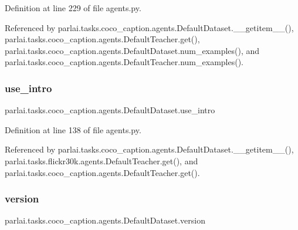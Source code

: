 Definition at line 229 of file agents.\+py.



Referenced by parlai.\+tasks.\+coco\+\_\+caption.\+agents.\+Default\+Dataset.\+\_\+\+\_\+getitem\+\_\+\+\_\+(), parlai.\+tasks.\+coco\+\_\+caption.\+agents.\+Default\+Teacher.\+get(), parlai.\+tasks.\+coco\+\_\+caption.\+agents.\+Default\+Dataset.\+num\+\_\+examples(), and parlai.\+tasks.\+coco\+\_\+caption.\+agents.\+Default\+Teacher.\+num\+\_\+examples().

\mbox{\label{classparlai_1_1tasks_1_1coco__caption_1_1agents_1_1DefaultDataset_a4ea15a073ab9a7e601922ecbb44ded4b}} 
\subsubsection{\texorpdfstring{use\+\_\+intro}{use\_intro}}
{\footnotesize\ttfamily parlai.\+tasks.\+coco\+\_\+caption.\+agents.\+Default\+Dataset.\+use\+\_\+intro}



Definition at line 138 of file agents.\+py.



Referenced by parlai.\+tasks.\+coco\+\_\+caption.\+agents.\+Default\+Dataset.\+\_\+\+\_\+getitem\+\_\+\+\_\+(), parlai.\+tasks.\+flickr30k.\+agents.\+Default\+Teacher.\+get(), and parlai.\+tasks.\+coco\+\_\+caption.\+agents.\+Default\+Teacher.\+get().

\mbox{\label{classparlai_1_1tasks_1_1coco__caption_1_1agents_1_1DefaultDataset_a3f8225c248c5b7f8ccf67aeae46321fc}} 
\subsubsection{\texorpdfstring{version}{version}}
{\footnotesize\ttfamily parlai.\+tasks.\+coco\+\_\+caption.\+agents.\+Default\+Dataset.\+version}



